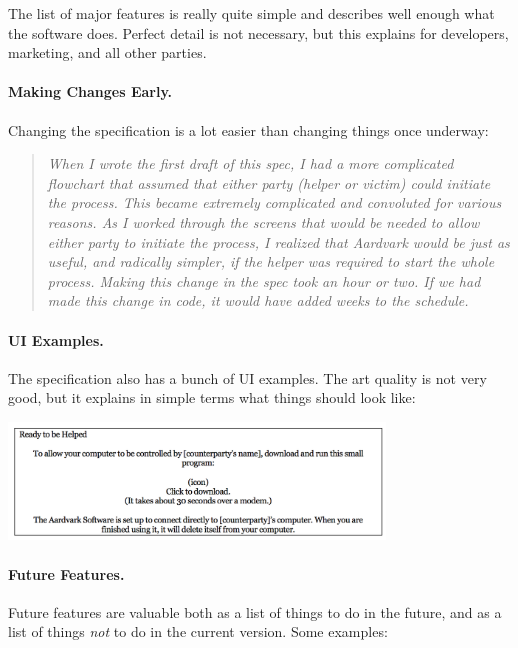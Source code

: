 The list of major features is really quite simple and describes well enough what the software does. Perfect detail is not necessary, but this explains for developers, marketing, and all other parties.

\paragraph{Making Changes Early.}
Changing the specification is a lot easier than changing things once underway:

\begin{quote}
\textit{When I wrote the first draft of this spec, I had a more complicated flowchart that assumed that either party (helper or victim) could initiate the process. This became extremely complicated and convoluted for various reasons. As I worked through the screens that would be needed to allow either party to initiate the process, I realized that Aardvark would be just as useful, and radically simpler, if the helper was required to start the whole process. Making this change in the spec took an hour or two. If we had made this change in code, it would have added weeks to the schedule.}
\end{quote}

\paragraph{UI Examples.}
The specification also has a bunch of UI examples. The art quality is not very good, but it explains in simple terms what things should look like:

\begin{center}
	\includegraphics[width=0.75\textwidth]{images/aardvarkui.png}
\end{center}

\paragraph{Future Features.}
Future features are valuable both as a list of things to do in the future, and as a list of things \textit{not} to do in the current version. Some examples:

